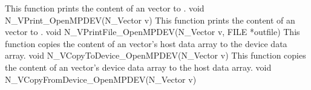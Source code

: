 {
 This function prints the content of an {\nvecopenmpdev} vector to .
}
{
 void N\_VPrint\_OpenMPDEV(N\_Vector v)
}
{
 This function prints the content of an {\nvecopenmpdev} vector to .
}
{
 void N\_VPrintFile\_OpenMPDEV(N\_Vector v, FILE *outfile)
}
{
 This function copies the content of an {\nvecopenmpdev} vector's host data array
 to the device data array.
}
{
 void N\_VCopyToDevice\_OpenMPDEV(N\_Vector v)
}
{
 This function copies the content of an {\nvecopenmpdev} vector's device data array
 to the host data array.
}
{
  void N\_VCopyFromDevice\_OpenMPDEV(N\_Vector v)
}

